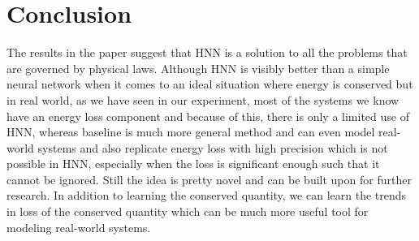\documentclass{article}
\begin{document}
\section{Conclusion}
The results in the paper suggest that HNN is a solution to all the problems that are governed by physical laws. Although HNN is visibly better than a simple neural network when it comes to an ideal situation where energy is conserved but in real world, as we have seen in our experiment, most of the systems we know have an energy loss component and because of this, there is only a limited use of HNN, whereas baseline is much more general method and can even model real-world systems and also replicate energy loss with high precision which is not possible in HNN, especially when the loss is significant enough such that it cannot be ignored. Still the idea is pretty novel and can be built upon for further research. In addition to learning the conserved quantity, we can learn the trends in loss of the conserved quantity which can be much more useful tool for modeling real-world systems.


\end{document}
